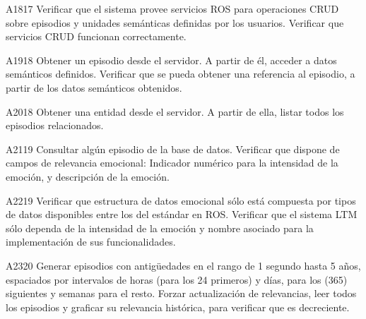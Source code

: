 \begin{def-validacion}{A}{18}{17}
	Verificar que el sistema provee servicios ROS para operaciones CRUD sobre episodios y unidades semánticas definidas por los usuarios. Verificar que servicios CRUD funcionan correctamente.
\end{def-validacion}

\begin{def-validacion}{A}{19}{18}
	Obtener un episodio desde el servidor. A partir de él, acceder a datos semánticos definidos. Verificar que se pueda obtener una referencia al episodio, a partir de los datos semánticos obtenidos.	
\end{def-validacion}

\begin{def-validacion}{A}{20}{18}
	Obtener una entidad desde el servidor. A partir de ella, listar todos los episodios relacionados.	
\end{def-validacion}

\begin{def-validacion}{A}{21}{19}
	Consultar algún episodio de la base de datos. Verificar que dispone de campos de relevancia emocional: Indicador numérico para la intensidad de la emoción, y descripción de la emoción.	
\end{def-validacion}

\begin{def-validacion}{A}{22}{19}
Verificar que estructura de datos emocional sólo está compuesta por tipos de datos disponibles entre los del estándar en ROS. Verificar que el sistema LTM sólo dependa de la intensidad de la emoción y nombre asociado para la implementación de sus funcionalidades.	
\end{def-validacion}

\begin{def-validacion}{A}{23}{20}
	Generar episodios con antigüedades en el rango de 1 segundo hasta 5 años, espaciados por intervalos de horas (para los 24 primeros) y días, para los (365) siguientes y semanas para el resto. Forzar actualización de relevancias, leer todos los episodios y graficar su relevancia histórica, para verificar que es decreciente.	
\end{def-validacion}

